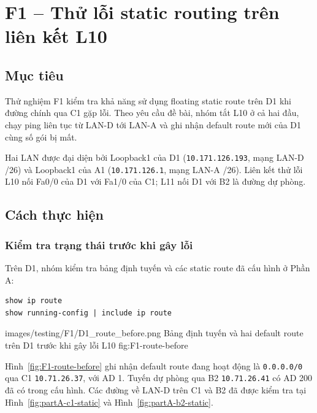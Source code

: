 
\section{F1 -- Thử lỗi static routing trên liên kết L10}
\label{sec:F1}

\subsection{Mục tiêu}

Thử nghiệm F1 kiểm tra khả năng sử dụng floating static route
trên D1 khi đường chính qua C1 gặp lỗi.
Theo yêu cầu đề bài, nhóm tắt L10 ở cả hai đầu,
chạy ping liên tục từ LAN-D tới LAN-A và ghi nhận
default route mới của D1 cùng số gói bị mất.

Hai LAN được đại diện bởi Loopback1 của D1
(\texttt{10.171.126.193}, mạng LAN-D /26)
và Loopback1 của A1
(\texttt{10.171.126.1}, mạng LAN-A /26).
Liên kết thử lỗi L10 nối Fa0/0 của D1 với Fa1/0 của C1;
L11 nối D1 với B2 là đường dự phòng.

\subsection{Cách thực hiện}

\subsubsection{Kiểm tra trạng thái trước khi gây lỗi}

Trên D1, nhóm kiểm tra bảng định tuyến
và các static route đã cấu hình ở Phần A:

\begin{lstlisting}
show ip route
show running-config | include ip route
\end{lstlisting}

\partzeroimage
{images/testing/F1/D1_route_before.png}
{Bảng định tuyến và hai default route trên D1 trước khi gây lỗi L10}
{fig:F1-route-before}

Hình~\ref{fig:F1-route-before} ghi nhận default route
đang hoạt động là \texttt{0.0.0.0/0} qua C1
\texttt{10.71.26.37}, với AD 1.
Tuyến dự phòng qua B2 \texttt{10.71.26.41}
có AD 200 đã có trong cấu hình.
Các đường về LAN-D trên C1 và B2 đã được kiểm tra tại
Hình~\ref{fig:partA-c1-static}
và Hình~\ref{fig:partA-b2-static}.

